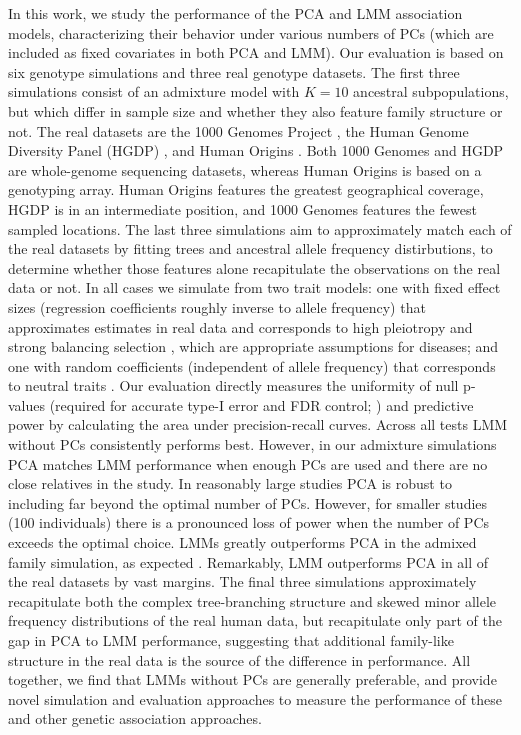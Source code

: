 \documentclass[11pt]{article}
\begin{document}
In this work, we study the performance of the PCA and LMM association models, characterizing their behavior under various numbers of PCs (which are included as fixed covariates in both PCA and LMM).
Our evaluation is based on six genotype simulations and three real genotype datasets.
The first three simulations consist of an admixture model with $K = 10$ ancestral subpopulations, but which differ in sample size and whether they also feature family structure or not.
The real datasets are the 1000 Genomes Project \citep{the_1000_genomes_project_consortium_map_2010, 1000_genomes_project_consortium_integrated_2012}, the Human Genome Diversity Panel (HGDP) \citep{cann_human_2002, rosenberg_genetic_2002, bergstrom_insights_2020}, and Human Origins \citep{patterson_ancient_2012, lazaridis_ancient_2014, lazaridis_genomic_2016, skoglund_genomic_2016}.
Both 1000 Genomes and HGDP are whole-genome sequencing datasets, whereas Human Origins is based on a genotyping array.
Human Origins features the greatest geographical coverage, HGDP is in an intermediate position, and 1000 Genomes features the fewest sampled locations.
The last three simulations aim to approximately match each of the real datasets by fitting trees and ancestral allele frequency distirbutions, to determine whether those features alone recapitulate the observations on the real data or not.
In all cases we simulate from two trait models: one with fixed effect sizes (regression coefficients roughly inverse to allele frequency) that approximates estimates in real data \citep{park_distribution_2011} and corresponds to high pleiotropy and strong balancing selection \citep{simons_population_2018}, which are appropriate assumptions for diseases; and one with random coefficients (independent of allele frequency) that corresponds to neutral traits \citep{simons_population_2018}.
Our evaluation directly measures the uniformity of null p-values (required for accurate type-I error and FDR control; \cite{storey_positive_2003, storey_statistical_2003}) and predictive power by calculating the area under precision-recall curves.
Across all tests LMM without PCs consistently performs best.
However, in our admixture simulations PCA matches LMM performance when enough PCs are used and there are no close relatives in the study.
In reasonably large studies PCA is robust to including far beyond the optimal number of PCs.
However, for smaller studies (100 individuals) there is a pronounced loss of power when the number of PCs exceeds the optimal choice.
LMMs greatly outperforms PCA in the admixed family simulation, as expected \citep{patterson_population_2006, price_new_2010}.
Remarkably, LMM outperforms PCA in all of the real datasets by vast margins.
The final three simulations approximately recapitulate both the complex tree-branching structure and skewed minor allele frequency distributions of the real human data, but recapitulate only part of the gap in PCA to LMM performance, suggesting that additional family-like structure in the real data is the source of the difference in performance.
All together, we find that LMMs without PCs are generally preferable, and provide novel simulation and evaluation approaches to measure the performance of these and other genetic association approaches.
\end{document}
